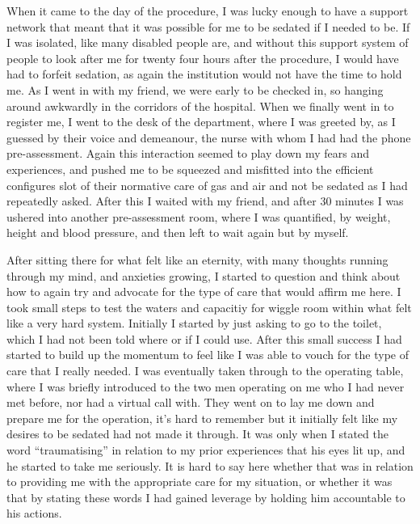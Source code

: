 When it came to the day of the procedure, I was lucky enough to have a
support network that meant that it was possible for me to be sedated if
I needed to be. If I was isolated, like many disabled people are, and
without this support system of people to look after me for twenty four
hours after the procedure, I would have had to forfeit sedation, as
again the institution would not have the time to hold me. As I went in
with my friend, we were early to be checked in, so hanging around
awkwardly in the corridors of the hospital. When we finally went in to
register me, I went to the desk of the department, where I was greeted
by, as I guessed by their voice and demeanour, the nurse with whom I had
had the phone pre-assessment. Again this interaction seemed to play down
my fears and experiences, and pushed me to be squeezed and misfitted
into the efficient configures slot of their normative care of gas and
air and not be sedated as I had repeatedly asked. After this I waited
with my friend, and after 30 minutes I was ushered into another
pre-assessment room, where I was quantified, by weight, height and blood
pressure, and then left to wait again but by myself.

After sitting there for what felt like an eternity, with many thoughts
running through my mind, and anxieties growing, I started to question
and think about how to again try and advocate for the type of care that
would affirm me here. I took small steps to test the waters and
capacitiy for wiggle room within what felt like a very hard system.
Initially I started by just asking to go to the toilet, which I had not
been told where or if I could use. After this small success I had
started to build up the momentum to feel like I was able to vouch for
the type of care that I really needed. I was eventually taken through to
the operating table, where I was briefly introduced to the two men
operating on me who I had never met before, nor had a virtual call with.
They went on to lay me down and prepare me for the operation, it's hard
to remember but it initially felt like my desires to be sedated had not
made it through. It was only when I stated the word ``traumatising'' in
relation to my prior experiences that his eyes lit up, and he started to
take me seriously. It is hard to say here whether that was in relation
to providing me with the appropriate care for my situation, or whether
it was that by stating these words I had gained leverage by holding him
accountable to his actions.

